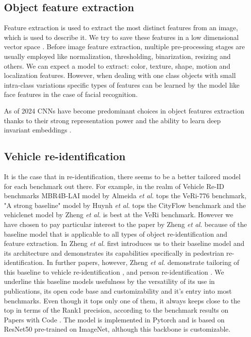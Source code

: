 \documentclass[conference]{IEEEtran} %
\begin{document}
	\subsection{Object feature extraction}
	
		Feature extraction is used to extract the most distinct features from an image, which is used to describe it. We try to save these features in a low dimensional vector space \cite{salau2019feature}. Before image feature extraction, multiple pre-processing stages are usually employed like normalization, thresholding, binarization, resizing and others. We can expect a model to extract: color, texture, shape, motion and localization features. However, when dealing with one class objects with small intra-class variations specific types of features can be learned by the model like face features in the case of facial recognition.
		
		As of 2024 CNNs have become predominant choices in object features extraction thanks to their strong representation power and the ability to learn deep invariant embeddings \cite{zheng2019joint}.
	
	\subsection{Vehicle re-identification}
	\label{sec:vehicle re-identification}
	
		It is the case that in re-identification, there seems to be a better tailored model for each benchmark out there. For example, in the realm of Vehicle Re-ID benchmarks MBR4B-LAI model by Almeida \textit{et al.} \cite{almeida2023strength} tops the VeRi-776 benchmark, "A strong baseline" model by Huynh \textit{et al.} \cite{huynh2021strong} tops the CityFlow benchmark and the vehiclenet model by Zheng \textit{et al.} \cite{zheng2019vehiclenet} is best at the VeRi benchmark. However we have chosen to pay particular interest to the paper by Zheng \textit{et al.} because of the baseline model that is applicable to all types of object re-identification and feature extraction. In \cite{zheng2017discriminatively} Zheng \textit{et al.} first introduces us to their baseline model and its architecture and demonstrates its capabilities specifically in pedestrian re-identification. In further papers, however, Zheng \textit{et al.} demonstrate tailoring of this baseline to vehicle re-identification \cite{zheng2019vehiclenet}, \cite{zheng2020vehiclenet} and person re-identification \cite{zheng2019joint}. We underline this baseline models usefulness by the versatility of its use in publications, its open code base and customizability and it's entry into most benchmarks. Even though it tops only one of them, it always keeps close to the top in terms of the Rank1 precision, according to the benchmark results on Papers with Code \cite{paperswithcode2024reid}. The model is implemented in Pytorch and is based on ResNet50 pre-trained on ImageNet, although this backbone is customizable.
	
\end{document}
